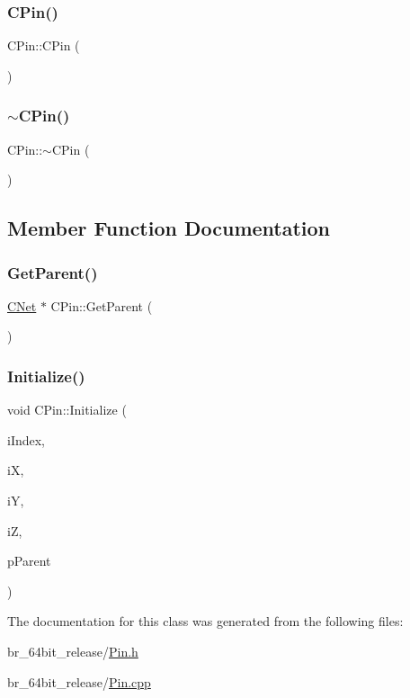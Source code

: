 \subsubsection{\texorpdfstring{CPin()}{CPin()}}
{\footnotesize\ttfamily C\+Pin\+::\+C\+Pin (\begin{DoxyParamCaption}{ }\end{DoxyParamCaption})}

\mbox{\label{classCPin_adfd0f2db0a4d35e2fa64a57a72cfcf13}} 
\subsubsection{\texorpdfstring{$\sim$CPin()}{~CPin()}}
{\footnotesize\ttfamily C\+Pin\+::$\sim$\+C\+Pin (\begin{DoxyParamCaption}{ }\end{DoxyParamCaption})\hspace{0.3cm}{\ttfamily [virtual]}}



\subsection{Member Function Documentation}
\mbox{\label{classCPin_a973360bb15e72845cc423efb6baaeed2}} 
\subsubsection{\texorpdfstring{GetParent()}{GetParent()}}
{\footnotesize\ttfamily \mbox{\hyperlink{classCNet}{C\+Net}} $\ast$ C\+Pin\+::\+Get\+Parent (\begin{DoxyParamCaption}{ }\end{DoxyParamCaption})}

\mbox{\label{classCPin_af52f7596a7edd0160763f881d0eb70c5}} 
\subsubsection{\texorpdfstring{Initialize()}{Initialize()}}
{\footnotesize\ttfamily void C\+Pin\+::\+Initialize (\begin{DoxyParamCaption}\item[{int}]{i\+Index,  }\item[{int}]{iX,  }\item[{int}]{iY,  }\item[{int}]{iZ,  }\item[{\mbox{\hyperlink{classCNet}{C\+Net}} $\ast$}]{p\+Parent }\end{DoxyParamCaption})\hspace{0.3cm}{\ttfamily [virtual]}}



The documentation for this class was generated from the following files\+:\begin{DoxyCompactItemize}
\item 
br\+\_\+64bit\+\_\+release/\mbox{\hyperlink{Pin_8h}{Pin.\+h}}\item 
br\+\_\+64bit\+\_\+release/\mbox{\hyperlink{Pin_8cpp}{Pin.\+cpp}}\end{DoxyCompactItemize}
